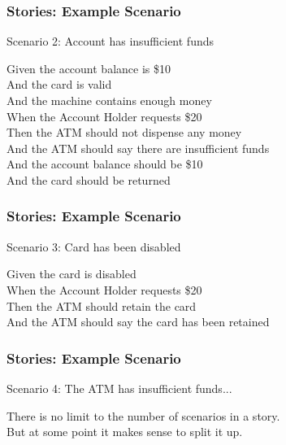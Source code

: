 \begin{frame}
	\frametitle{Stories: Example Scenario}
	\begin{changemargin}{1cm}
	
Scenario 2: Account has insufficient funds

Given the account balance is \$10\\
 And the card is valid\\
 And the machine contains enough money\\
When the Account Holder requests \$20\\
Then the ATM should not dispense any money\\
 And the ATM should say there are insufficient funds\\
 And the account balance should be \$10\\
 And the card should be returned
					
	\end{changemargin}
\end{frame}

\begin{frame}
	\frametitle{Stories: Example Scenario}
	\begin{changemargin}{1cm}
	
Scenario 3: Card has been disabled

Given the card is disabled\\
When the Account Holder requests \$20\\
Then the ATM should retain the card\\
And the ATM should say the card has been retained
					
	\end{changemargin}
\end{frame}

\begin{frame}
	\frametitle{Stories: Example Scenario}
	\begin{changemargin}{1cm}
	
Scenario 4: The ATM has insufficient funds...

There is no limit to the number of scenarios in a story.\\
\hfill But at some point it makes sense to split it up.

	\end{changemargin}
\end{frame}


